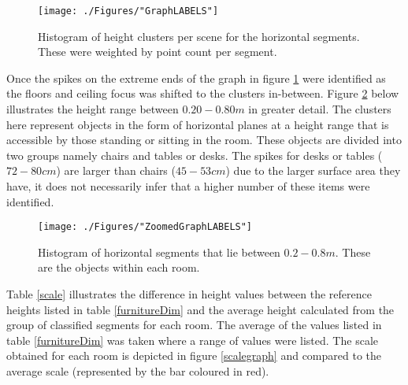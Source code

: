 \begin{figure}[h!]
	\centering
	\vspace{-2.5mm}
	\texttt{[image: ./Figures/"GraphLABELS"]}
	\vspace{-10mm}
	\caption[Histogram of height clusters per scene]{Histogram of height clusters per scene for the horizontal segments. These were weighted by point count per segment. \label{Histogram}}
\end{figure}
\clearpage

Once the spikes on the extreme ends of the graph in figure \ref{Histogram} were identified as the floors and ceiling focus was shifted to the clusters in-between. Figure \ref{HistogramZoom} below illustrates the height range between $0.20-0.80m$ in greater detail. The clusters here represent objects in the form of horizontal planes at a height range that is accessible by those standing or sitting in the room. These objects are divided into two groups namely chairs and tables or desks. The spikes for desks or tables ($72-80cm$) are larger than chairs ($45-53cm$) due to the larger surface area they have, it does not necessarily infer that a higher number of these items were identified.  

\begin{figure}[h!]
	\centering
	\vspace{-2.5mm}
	\texttt{[image: ./Figures/"ZoomedGraphLABELS"]}
	\vspace{-10mm}
	\caption[Histogram illustrating the objects in each room]{Histogram of horizontal segments that lie between $0.2-0.8m$. These are the objects within each room. \label{HistogramZoom}}
\end{figure}

Table \ref{scale} illustrates the difference in height values between the reference heights listed in table \ref{furnitureDim} and the average height calculated from the group of classified segments for each room. The average of the values listed in table \ref{furnitureDim} was taken where a range of values were listed. The scale obtained for each room is depicted in figure \ref{scalegraph} and compared to the average scale (represented by the bar coloured in red).

